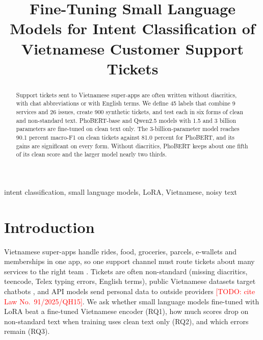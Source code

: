 \documentclass[conference]{IEEEtran}
\newcommand{\TODO}[1]{\textcolor{red}{[TODO: #1]}}
\begin{document}
\title{Fine-Tuning Small Language Models for Intent Classification of Vietnamese Customer Support Tickets}

\author{
\IEEEauthorblockN{\TODO{Member 1}}
\IEEEauthorblockA{\TODO{University}, Vietnam \\ \TODO{email}}
\and
\IEEEauthorblockN{\TODO{Member 2}}
\IEEEauthorblockA{\TODO{University}, Vietnam \\ \TODO{email}}
\and
\IEEEauthorblockN{\TODO{Member 3}}
\IEEEauthorblockA{\TODO{University}, Vietnam \\ \TODO{email}}
}

\maketitle

\begin{abstract}
Support tickets sent to Vietnamese super-apps are often written without
diacritics, with chat abbreviations or with English terms. We define 45
labels that combine 9 services and 26 issues, create 900 synthetic
tickets, and test each in six forms of clean and non-standard text.
PhoBERT-base and Qwen2.5 models with 1.5 and 3 billion parameters are
fine-tuned on clean text only. The 3-billion-parameter model reaches 90.1
percent macro-F1 on clean tickets against 81.0 percent for PhoBERT, and its
gains are significant on every form. Without diacritics, PhoBERT keeps
about one fifth of its clean score and the larger model nearly two thirds.
\end{abstract}

\begin{IEEEkeywords}
intent classification, small language models, LoRA, Vietnamese, noisy text
\end{IEEEkeywords}

\section{Introduction}
\label{sec:intro}
Vietnamese super-apps handle rides, food, groceries, parcels, e-wallets
and memberships in one app, so one support channel must route tickets about
many services to the right team \cite{fodor2026beyond}. Tickets are often
non-standard (missing diacritics, teencode, Telex typing errors, English
terms), public Vietnamese datasets target chatbots
\cite{tran2020understanding}, and API models send personal data to outside
providers \TODO{cite Law No.~91/2025/QH15}. We ask whether small language
models fine-tuned with LoRA beat a fine-tuned Vietnamese encoder (RQ1), how
much scores drop on non-standard text when training uses clean text only
(RQ2), and which errors remain (RQ3).
\end{document}
